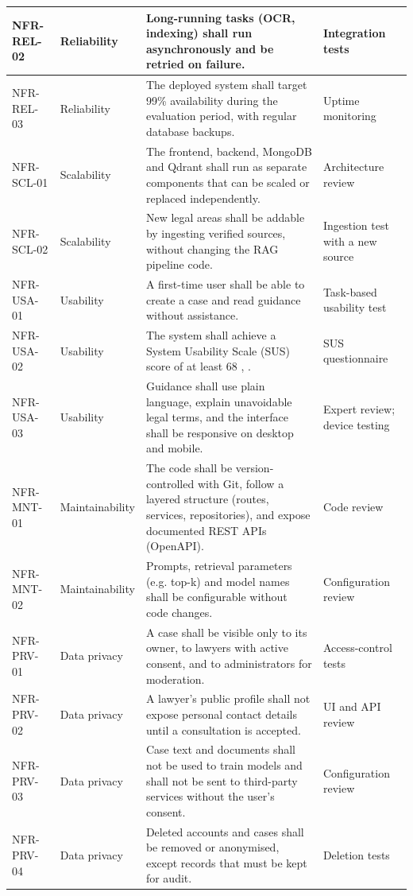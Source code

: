 \begin{longtable}{|L{1.70cm}|L{1.70cm}|L{7.76cm}|L{2.85cm}|}
NFR-REL-02 & Reliability & Long-running tasks (OCR, indexing) shall run asynchronously and be retried on failure. & Integration tests \\ \hline
NFR-REL-03 & Reliability & The deployed system shall target 99\% availability during the evaluation period, with regular database backups. & Uptime monitoring \\ \hline
NFR-SCL-01 & Scalability & The frontend, backend, MongoDB and Qdrant shall run as separate components that can be scaled or replaced independently. & Architecture review \\ \hline
NFR-SCL-02 & Scalability & New legal areas shall be addable by ingesting verified sources, without changing the RAG pipeline code. & Ingestion test with a new source \\ \hline
NFR-USA-01 & Usability & A first-time user shall be able to create a case and read guidance without assistance. & Task-based usability test \\ \hline
NFR-USA-02 & Usability & The system shall achieve a System Usability Scale (SUS) score of at least 68 \cite{r29}, \cite{r30}. & SUS questionnaire \\ \hline
NFR-USA-03 & Usability & Guidance shall use plain language, explain unavoidable legal terms, and the interface shall be responsive on desktop and mobile. & Expert review; device testing \\ \hline
NFR-MNT-01 & Maintainability & The code shall be version-controlled with Git, follow a layered structure (routes, services, repositories), and expose documented REST APIs (OpenAPI). & Code review \\ \hline
NFR-MNT-02 & Maintainability & Prompts, retrieval parameters (e.g. top-k) and model names shall be configurable without code changes. & Configuration review \\ \hline
NFR-PRV-01 & Data privacy & A case shall be visible only to its owner, to lawyers with active consent, and to administrators for moderation. & Access-control tests \\ \hline
NFR-PRV-02 & Data privacy & A lawyer's public profile shall not expose personal contact details until a consultation is accepted. & UI and API review \\ \hline
NFR-PRV-03 & Data privacy & Case text and documents shall not be used to train models and shall not be sent to third-party services without the user's consent. & Configuration review \\ \hline
NFR-PRV-04 & Data privacy & Deleted accounts and cases shall be removed or anonymised, except records that must be kept for audit. & Deletion tests \\ \hline

\end{longtable}
